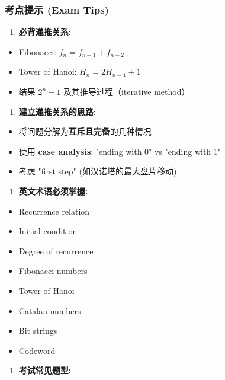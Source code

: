 \documentclass[10pt,a4paper,openany]{ctexbook}
\theoremstyle{definition}
\theoremstyle{remark}
\begin{document}
\subsubsection{考点提示 (Exam Tips)}

\begin{enumerate}
\item \textbf{必背递推关系:}
\end{enumerate}

\begin{itemize}
\item Fibonacci: $f_n = f_{n-1} + f_{n-2}$
\item Tower of Hanoi: $H_n = 2H_{n-1} + 1$
\item 结果 $2^n - 1$ 及其推导过程（iterative method）

\end{itemize}

\begin{enumerate}
\item \textbf{建立递推关系的思路:}
\end{enumerate}

\begin{itemize}
\item 将问题分解为\textbf{互斥且完备}的几种情况
\item 使用 \textbf{case analysis}: "ending with 0" vs "ending with 1"
\item 考虑 "first step" (如汉诺塔的最大盘片移动)

\end{itemize}

\begin{enumerate}
\item \textbf{英文术语必须掌握:}
\end{enumerate}

\begin{itemize}
\item Recurrence relation
\item Initial condition
\item Degree of recurrence
\item Fibonacci numbers
\item Tower of Hanoi
\item Catalan numbers
\item Bit strings
\item Codeword

\end{itemize}

\begin{enumerate}
\item \textbf{考试常见题型:}
\end{enumerate}
\end{document}
